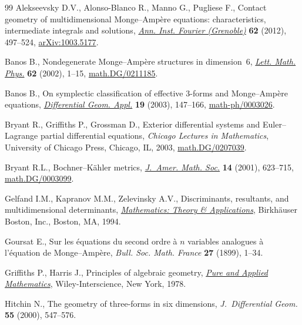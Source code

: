 \documentclass[11pt]{article}
\begin{document}
\begin{thebibliography}{99}
Alekseevsky D.V., Alonso-Blanco R., Manno G., Pugliese F., Contact geometry of
  multidimensional {M}onge--{A}mp\`ere equations: characteristics, intermediate
  integrals and solutions, \href{http://dx.doi.org/10.5802/aif.2686}{\textit{Ann. Inst. Fourier (Grenoble)}} \textbf{62}
  (2012), 497--524, \href{http://arxiv.org/abs/1003.5177}{arXiv:1003.5177}.

Banos B., Nondegenerate {M}onge--{A}mp\`ere structures in dimension~6,
  \href{http://dx.doi.org/10.1023/A:1021655609692}{\textit{Lett. Math. Phys.}} \textbf{62} (2002), 1--15,
  \href{http://arxiv.org/abs/math.DG/0211185}{math.DG/0211185}.

Banos B., On symplectic classif\/ication of ef\/fective 3-forms and
  {M}onge--{A}mp\`ere equations, \href{http://dx.doi.org/10.1016/S0926-2245(03)00017-2}{\textit{Differential Geom. Appl.}} \textbf{19}
  (2003), 147--166, \href{http://arxiv.org/abs/math-ph/0003026}{math-ph/0003026}.

Bryant R., Grif\/f\/iths P., Grossman D., Exterior dif\/ferential systems and
  {E}uler--{L}agrange partial dif\/ferential equations, \textit{Chicago Lectures in
  Mathematics}, University of Chicago Press, Chicago, IL, 2003,
  \href{http://arxiv.org/abs/math.DG/0207039}{math.DG/0207039}.

Bryant R.L., Bochner--{K}\"ahler metrics, \href{http://dx.doi.org/10.1090/S0894-0347-01-00366-6}{\textit{J.~Amer. Math. Soc.}}
  \textbf{14} (2001), 623--715, \href{http://arxiv.org/abs/math.DG/0003099}{math.DG/0003099}.

Gelfand I.M., Kapranov M.M., Zelevinsky A.V., Discriminants, resultants, and
  multidimensional determinants, \href{http://dx.doi.org/10.1007/978-0-8176-4771-1}{\textit{Mathematics: Theory \& Applications}},
  Birkh\"auser Boston, Inc., Boston, MA, 1994.

Goursat E., Sur les \'equations du second ordre \`a {$n$} variables analogues
  \`a l'\'equation de {M}onge--{A}mp\`ere, \textit{Bull. Soc. Math. France}
  \textbf{27} (1899), 1--34.

Grif\/f\/iths P., Harris J., Principles of algebraic geometry, \href{http://dx.doi.org/10.1002/9781118032527}{\textit{Pure and Applied Mathematics}}, Wiley-Interscience,
  New York, 1978.

Hitchin N., The geometry of three-forms in six dimensions,
  \textit{J.~Differential Geom.} \textbf{55} (2000), 547--576.


\end{thebibliography}
\end{document}
